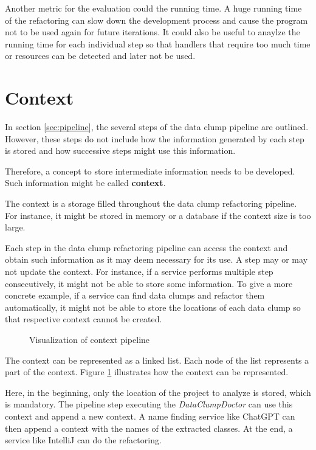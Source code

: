 Another metric for the evaluation could the running time. A huge running time of the refactoring can slow down the development process and cause the program not to be used again for future iterations. It could also be useful to anaylze the running time for each individual step so that handlers that require too much time or resources can be detected and later not be used. 

\section{Context}
In section \ref{sec:pipeline}, the several steps of the data clump pipeline are outlined. However, these steps do not include how the information generated by each step is stored and how successive steps might use this information.

Therefore, a concept to store intermediate information needs to be developed. Such information might be called \textbf{context}.

The context is a storage filled throughout the data clump refactoring pipeline. For instance, it might be stored in memory or a database if the context size is too large.

Each step in the data clump refactoring pipeline can access the context and obtain such information as it may deem necessary for its use. A step may or may not update the context. For instance, if a service performs multiple step consecutively, it might not be able to store some information. To give a more concrete example, if a service can find data clumps and refactor them automatically, it might not be able to store the locations of each data clump so that respective context cannot be created. 

\begin{figure}
    \centering
    
    \caption{Visualization of context pipeline}
    \label{fig:context_pipeline}
\end{figure}

The context can be represented as a linked list. Each node of the list represents a part of the context. Figure \ref{fig:context_pipeline} illustrates how the context can be  represented.

Here, in the beginning, only the location of the project to analyze is stored, which is mandatory. The pipeline step executing the \textit{DataClumpDoctor} can use this context and append a new context. A name finding service like ChatGPT can then append a context with the names of the extracted classes. At the end, a service like IntelliJ can do the refactoring.

